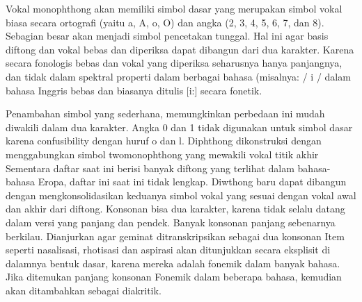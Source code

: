 Vokal monophthong akan memiliki simbol dasar yang merupakan simbol vokal biasa secara ortografi
(yaitu a, A, o, O) dan angka (2, 3, 4, 5, 6, 7, dan 8). Sebagian besar akan menjadi simbol pencetakan tunggal.
Hal ini agar basis diftong dan vokal bebas dan diperiksa dapat dibangun dari dua karakter.
Karena secara fonologis bebas dan vokal yang diperiksa seharusnya hanya panjangnya, dan tidak dalam spektral
properti dalam berbagai bahasa (misalnya: / i / dalam bahasa Inggris bebas dan biasanya ditulis [i:] secara fonetik.

Penambahan simbol yang sederhana, memungkinkan perbedaan ini mudah diwakili dalam dua karakter. Angka 0 dan 1
tidak digunakan untuk simbol dasar karena confusibility dengan huruf o dan l.
Diphthong dikonstruksi dengan menggabungkan simbol twomonophthong yang mewakili
vokal titik akhir Sementara daftar saat ini berisi banyak diftong yang terlihat dalam bahasa-bahasa Eropa,
daftar ini saat ini tidak lengkap. Diwthong baru dapat dibangun dengan mengkonsolidasikan keduanya
simbol vokal yang sesuai dengan vokal awal dan akhir dari diftong.
Konsonan bisa dua karakter, karena tidak selalu datang dalam versi yang panjang dan pendek.
Banyak konsonan panjang sebenarnya berkilau. Dianjurkan agar geminat ditranskripsikan sebagai
dua konsonan Item seperti nasalisasi, rhotisasi dan aspirasi akan ditunjukkan secara eksplisit di dalamnya
bentuk dasar, karena mereka adalah fonemik dalam banyak bahasa. Jika ditemukan panjang konsonan
Fonemik dalam beberapa bahasa, kemudian akan ditambahkan sebagai diakritik.
